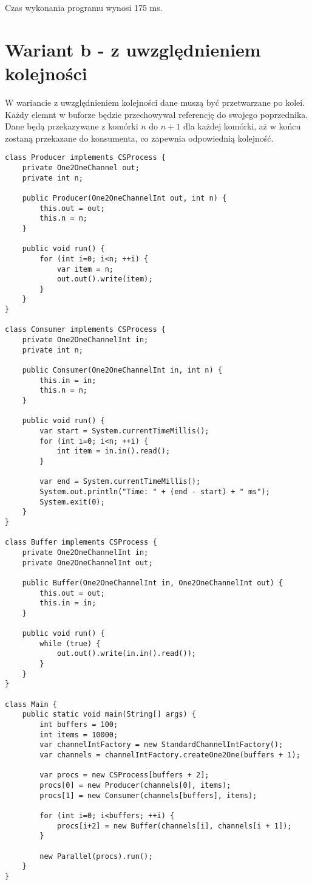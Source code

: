 \documentclass{article}
\begin{document}
Czas wykonania programu wynosi 175 ms.

\section{Wariant b - z uwzględnieniem kolejności}

W wariancie z uwzględnieniem kolejności dane muszą być przetwarzane po kolei. Każdy elemnt w buforze
będzie przechowywał referencję do swojego poprzednika. Dane będą przekazywane z komórki $n$ do $n+1$
dla każdej komórki, aż w końcu zostaną przekazane do konsumenta, co zapewnia odpowiednią kolejność.

\begin{verbatim}
class Producer implements CSProcess {
    private One2OneChannel out;
    private int n;
    
    public Producer(One2OneChannelInt out, int n) {
        this.out = out;
        this.n = n;
    }

    public void run() {
        for (int i=0; i<n; ++i) {
            var item = n;
            out.out().write(item);
        }
    }
}

class Consumer implements CSProcess {
    private One2OneChannelInt in;
    private int n;
    
    public Consumer(One2OneChannelInt in, int n) {
        this.in = in;
        this.n = n;
    }

    public void run() {
        var start = System.currentTimeMillis();
        for (int i=0; i<n; ++i) {
            int item = in.in().read();
        }

        var end = System.currentTimeMillis();
        System.out.println("Time: " + (end - start) + " ms");
        System.exit(0);
    }
}

class Buffer implements CSProcess {
    private One2OneChannelInt in;
    private One2OneChannelInt out;

    public Buffer(One2OneChannelInt in, One2OneChannelInt out) {
        this.out = out;
        this.in = in;
    }

    public void run() {
        while (true) {
            out.out().write(in.in().read());
        }
    }
}

class Main {
    public static void main(String[] args) {
        int buffers = 100;
        int items = 10000;
        var channelIntFactory = new StandardChannelIntFactory();
        var channels = channelIntFactory.createOne2One(buffers + 1);

        var procs = new CSProcess[buffers + 2];
        procs[0] = new Producer(channels[0], items);
        procs[1] = new Consumer(channels[buffers], items);

        for (int i=0; i<buffers; ++i) {
            procs[i+2] = new Buffer(channels[i], channels[i + 1]);
        }

        new Parallel(procs).run();
    }
}
\end{verbatim}
\end{document}
